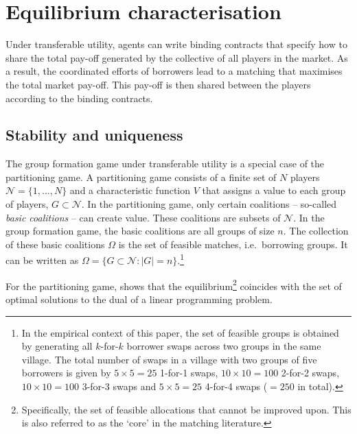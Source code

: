\section{Equilibrium characterisation} \label{Appendix:Equilibrium}

Under transferable utility, agents can write binding contracts that specify how to share the total pay-off generated by the collective of all players in the market. As a result, the coordinated efforts of borrowers lead to a matching that maximises the total market pay-off. This pay-off is then shared between the players according to the binding contracts.


\subsection{Stability and uniqueness}

The group formation game under transferable utility is a special case of the \citet{Kaneko1982} partitioning game. A partitioning game consists of a finite set of $N$ players $\mathcal N = \{1,...,N\}$ and a characteristic function $V$ that assigns a value to each group of players, $G \subset \mathcal N$. In the partitioning game, only certain coalitions -- so-called \textit{basic coalitions} -- can create value. These coalitions are subsets of $\mathcal N$. In the group formation game, the basic coalitions are all groups of size $n$. The collection of these basic coalitions $\Omega$ is the set of feasible matches, i.e.\ borrowing groups. It can be written as $\Omega= \{ G \subset \mathcal N : |G|=n \}$.\footnote{In the empirical context of this paper, the set of feasible groups is obtained by generating all $k$-for-$k$ borrower swaps across two groups in the same village. The total number of swaps in a village with two groups of five borrowers is given by $5\times5=25$ 1-for-1 swaps, $10\times10=100$ 2-for-2 swaps, $10\times10=100$ 3-for-3 swaps and $5\times5=25$ 4-for-4 swaps ($=250$ in total).}


For the partitioning game, \citet{Quint1991} shows that the equilibrium\footnote{Specifically, the set of feasible allocations that cannot be improved upon. This is also referred to as the `core' in the matching literature.} coincides with the set of optimal solutions to the dual of a linear programming problem. 


